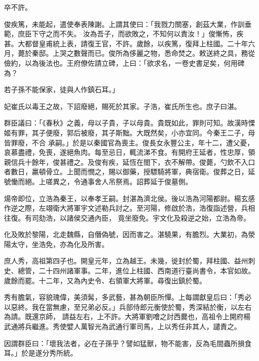 \begin{pinyinscope}
 卒不許。



 俊疾篤，未能起，遣使奉表陳謝。上謂其使曰：「我戮力關塞，創茲大業，作訓垂範，庶臣下守之而不失。
 汝為吾子，而欲敗之，不知何以責汝！」俊慚怖，疾甚。大都督皇甫統上表，請復王官，不許。歲餘，以疾篤，復拜上柱國。二十年六月，薨於秦邸。上哭之數聲而已。俊所為侈麗之物，悉命焚之。敕送終之具，務從儉約，以為後法也。王府僚佐請立碑，上曰：「欲求名，一卷史書足矣，何用碑為？



 若子孫不能保家，徒與人作鎮石耳。」



 妃崔氏以毒王之故，下詔廢絕，賜死於其家。子浩，崔氏所生也。庶子曰湛。



 群臣議曰：「《春秋》之義，母以子貴，子以母貴。貴既如此，罪則可知。故漢時慄姬有罪，其子便廢，郭后被廢，其子斯黜。大既然矣，小亦宜同。今秦王二子，母皆罪廢，不合
 承嗣。」於是以秦國官為喪主。俊長女永豐公主，年十二，遭父憂，哀慕盡禮，免喪，遂絕魚肉。每至忌日，輒流涕不食。有開府王延者，性忠厚，領親信兵十餘年，俊甚禮之。及俊有疾，延恆在閤下，衣不解帶。俊薨，勺飲不入口者數日，羸頓骨立。上聞而憫之，賜以御藥，授驃騎將軍，典宿衛。俊葬之日，延號慟而絕。上嗟異之，令通事舍人吊祭焉。詔葬延于俊墓側。



 煬帝即位，立浩為秦王，以奉孝王嗣。封湛為濟北侯。後以浩為河陽都尉。楊玄感作逆之際，左翊衛大將軍宇文述勒兵討之。至河陽，修啟於浩，浩復詣述營，兵相往復。有司劾浩，以諸侯交通內臣，
 竟坐廢免。宇文化及殺逆之始，立浩為帝。



 化及敗於黎陽，北走魏縣，自僭偽號，因而害之。湛驍果，有膽烈。大業初，為滎陽太守，坐浩免，亦為化及所害。



 庶人秀，高祖第四子也。開皇元年，立為越王。未幾，徙封於蜀，拜柱國、益州刺史、總管，二十四州諸軍事。二年，進位上柱國、西南道行臺尚書令，本官如故。歲餘而罷。十二年，又為內史令、右領軍大將軍。尋復出鎮於蜀。



 秀有膽氣，容貌瑰偉，美須髯，多武藝，甚為朝臣所憚。上每謂獻皇后曰：「秀必以惡終。我在當無慮，至兄弟必反。」兵部侍郎元衡使於蜀，秀深結於衡，以左右為請。既還京師，
 請益左右，上不許。大將軍劉噲之討西爨也，高祖令上開府楊武通將兵繼進。秀使嬖人萬智光為武通行軍司馬，上以秀任非其人，譴責之。



 因謂群臣曰：「壞我法者，必在子孫乎？譬如猛獸，物不能害，反為毛間蟲所損食耳。」於是遂分秀所統。




\end{pinyinscope}

